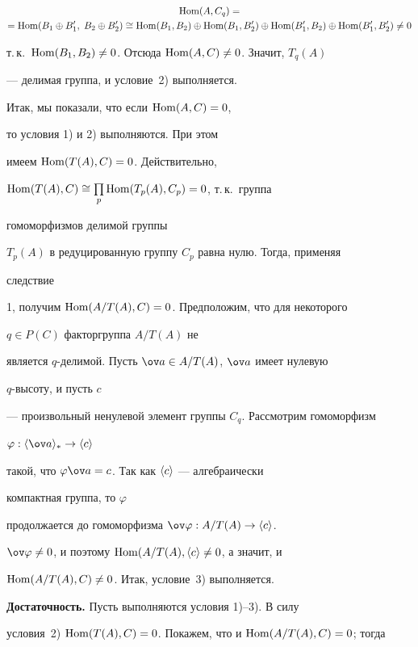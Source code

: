\begin{pf}
\begin{multline*}
\Hom(A,C_q)=\\ =\Hom(B_1\oplus B'_1,\;B_2\oplus B'_2)\cong 


\Hom(B_1,B_2)\oplus\Hom(B_1,B'_2)\oplus 


\Hom(B'_1,B_2)\oplus\Hom(B'_1,B'_2)\ne 0 


\end{multline*}  


т.\,к.~$\operatorname{Hom}(B_1,B_2)\ne0$. Отсюда $\operatorname{Hom}(A,C)\ne0$. Значит, $T_q(A)$ 


--- делимая группа, и условие~2) выполняется. 


 


Итак, мы показали, что если $\operatorname{Hom}(A,C)=0$, 


то условия 1) и 2) выполняются. При этом 


имеем $\operatorname{Hom}(T(A),C)=0$. Действительно, 


$\operatorname{Hom}(T(A),C)\cong\prod\limits_p\operatorname{Hom}(T_p(A),C_p)=0$, т.\,к.~группа 


гомоморфизмов делимой группы 


$T_p(A)$ в редуцированную группу $C_p$ равна нулю. Тогда, применяя 


следствие 


1, получим $\operatorname{Hom}(A/T(A),C)=0$. Предположим, что для некоторого 


$q\in P(C)$ факторгруппа $A/T(A)$ не 


является $q$-делимой. Пусть $\ov a\in A/T(A)$, $\ov a$ имеет нулевую 


$q$-высоту, и пусть $c$ 


--- произвольный ненулевой элемент группы $C_q$. Рассмотрим гомоморфизм 


$\varphi:\la\ov a\ra_*\to\la c\ra$ 


такой, что $\varphi\ov a=c$. Так как $\langle c\rangle$ --- алгебраически 


компактная группа, то $\varphi$ 


продолжается до гомоморфизма $\ov\varphi:A/T(A)\to\la c\ra$.\; 


$\ov\varphi\ne0$, и поэтому $\operatorname{Hom}(A/T(A),\langle c\rangle\ne0$, а значит, и 


$\operatorname{Hom}(A/T(A),C)\ne0$. Итак, условие~3) выполняется. 


 


{\bf Достаточность.} Пусть выполняются условия 1)--3). В силу 


условия~2)\; $\operatorname{Hom}(T(A),C)=0$. Покажем, что и $\operatorname{Hom}(A/T(A),C)=0$; тогда 



\end{pf}
